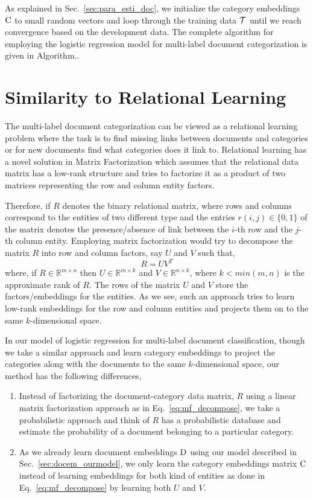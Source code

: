 As explained in Sec.~\ref{sec:para_esti_doc}, we initialize the category embeddings $\mathrm{C}$ to small random vectors and loop through the training data $\mathcal{T}$ until we reach convergence based on the development data. The complete algorithm for employing the logistic regression model for multi-label document categorization is given in Algorithm..

\section{Similarity to Relational Learning}
\label{sec:lr_similar_rl}
The multi-label document categorization can be viewed as a relational learning problem where the task is to find missing links between documents and categories or for new documents find what categories does it link to. Relational learning has a novel solution in Matrix Factorization which assumes that the relational data matrix has a low-rank structure and tries to factorize it as a product of two matrices representing the row and column entity factors. 

Therefore, if $R$ denotes the binary relational matrix, where rows and columns correspond to the entities of two different type and the entries $r(i, j) \in \{0,1\}$ of the matrix denotes the presence/absence of link between the $i$-th row and the $j$-th column entity. Employing matrix factorization would try to decompose the matrix $R$ into row and column factors, say $U$ and $V$ such that,
\begin{equation}
\label{eq:mf_decompose}
R = UV^{T}
\end{equation}
where, if $R \in \mathbb{R}^{m \times n}$ then $U \in \mathbb{R}^{m \times k}$ and $V \in \mathbb{R}^{n \times k}$, where $k < min(m, n)$ is the approximate rank of $R$. The rows of the matrix $U$ and $V$ store the factors/embeddings for the entities. As we see, such an approach tries to learn low-rank embeddings for the row and column entities and projects them on to the same $k$-dimensional space.

In our model of logistic regression for multi-label document classification, though we take a similar approach and learn category embeddings to project the categories along with the documents to the same $k$-dimensional space, our method has the following differences,
\begin{enumerate}
\item Instead of factorizing the document-category data matrix, $R$ using a linear matrix factorization approach as in Eq.~\ref{eq:mf_decompose}, we take a probabilistic approach and think of $R$ has a probabilistic database and estimate the probability of a document belonging to a particular category.

\item As we already learn document embeddings $\mathrm{D}$ using our model described in Sec.~\ref{sec:docem_ourmodel}, we only learn the category embeddings matrix $\mathrm{C}$ instead of learning embeddings for both kind of entities as done in Eq.~\ref{eq:mf_decompose} by learning both $U$ and $V$.
\end{enumerate}

